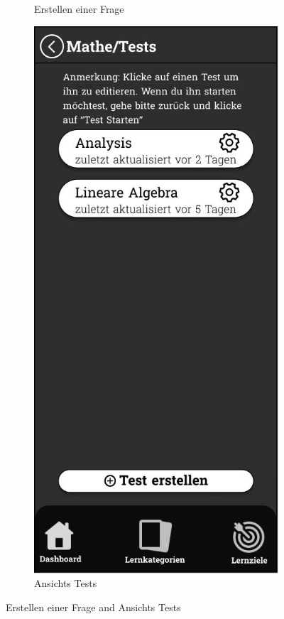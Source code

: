 \begin{figure}[htbp]
\begin{subfigure}[b]{0.45\linewidth}
    \caption{Erstellen einer Frage}
    \label{fig:frage-erstellen}
  \end{subfigure}
  \hfill
  \begin{subfigure}[b]{0.45\linewidth}
    \centering
    \includegraphics[width=\linewidth]{images/Mockups/Tests.JPG}
    \caption{Ansichts Tests}
    \label{fig:tests-ansicht}
  \end{subfigure}
  \caption{Erstellen einer Frage and Ansichts Tests}
  \label{fig:frage-tests}
\end{figure}

